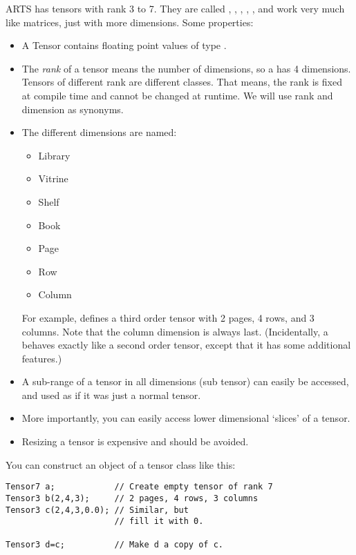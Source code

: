 \label{sec:matpack:tensors}

ARTS has tensors with rank 3 to 7. They are called
, , ,
, , and work very much like
matrices, just with more dimensions. Some properties:
\begin{itemize}
\item A Tensor contains floating point values of type .
\item The \emph{rank} of a tensor means the number of dimensions, so a
   has 4 dimensions. Tensors of different rank are
  different classes. That means, the rank is fixed at compile time and
  cannot be changed at runtime. We will use rank and dimension as
  synonyms. 
\item The different dimensions are named:
\begin{itemize}
\item Library
\item Vitrine
\item Shelf
\item Book
\item Page
\item Row
\item Column
\end{itemize}
For example,  defines a third order tensor with 2
pages, 4 rows, and 3 columns. Note that the column dimension is always
last. (Incidentally, a  behaves exactly like a second
order tensor, except that it has some additional features.) 
\item A sub-range of a tensor in all dimensions (sub tensor) can
  easily be accessed, and used as if it was just a normal tensor.
\item More importantly, you can easily access lower dimensional
  `slices' of a tensor. 
\item Resizing a tensor is expensive and should be avoided.
\end{itemize}

You can construct an object of a tensor class like this:

\begin{verbatim}
Tensor7 a;            // Create empty tensor of rank 7
Tensor3 b(2,4,3);     // 2 pages, 4 rows, 3 columns
Tensor3 c(2,4,3,0.0); // Similar, but
                      // fill it with 0.

Tensor3 d=c;          // Make d a copy of c.
\end{verbatim}


